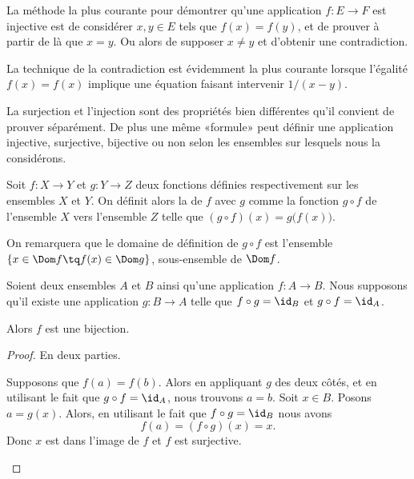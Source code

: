 \begin{normaltext}\label{NORMooMethodePreuveInj}
	La méthode la plus courante pour démontrer qu'une application \( f\colon E\to F\) est injective est de considérer \( x,y\in E\) tels que \( f(x)=f(y)\), et de prouver à partir de là que \( x=y\). Ou alors de supposer \( x\neq y\) et d'obtenir une contradiction.

	La technique de la contradiction est évidemment la plus courante lorsque l'égalité \( f(x)=f(x)\) implique une équation faisant intervenir \( 1/(x-y)\).

	La surjection et l'injection sont des propriétés bien différentes qu'il convient de prouver séparément. De plus une même «formule» peut définir une application injective, surjective, bijective ou non selon les ensembles sur lesquels nous la considérons.
\end{normaltext}

\begin{definition}  \label{DEFcomposeeFonctions}
	Soit \( f: X \to Y \) et \( g: Y \to Z \) deux fonctions définies respectivement sur les ensembles \( X \) et \( Y \). On définit alors la  de \( f \) avec \( g \) comme la fonction \( g \circ f \) de l'ensemble \( X \) vers l'ensemble \( Z \) telle que \( (g \circ f) (x) = g\bigl(f(x)\bigr) \).

	On remarquera que le domaine de définition de \( g \circ f \) est l'ensemble \( \{ x \in \Dom f \tq f(x) \in \Dom g\}\), sous-ensemble de \( \Dom f \).
\end{definition}

\begin{lemma}       \label{LEMooWBYSooFqyqQP}
	Soient deux ensembles \( A\) et \( B\) ainsi qu'une application \( f\colon A\to B\). Nous supposons qu'il existe une application \( g\colon B\to A\) telle que \( f\circ g=\id_B\) et \( g\circ f=\id_A\).

	Alors \( f\) est une bijection.
\end{lemma}

\begin{proof}
	En deux parties.
	\begin{subproof}
		\spitem[Injection]
		Supposons que \( f(a)=f(b)\). Alors en appliquant \( g\) des deux côtés, et en utilisant le fait que \( g\circ f=\id_A\), nous trouvons \( a=b\).
		\spitem[Surjection]
		Soit \( x\in B\). Posons \( a=g(x)\). Alors, en utilisant le fait que \( f\circ g=\id_B\) nous avons
		\begin{equation}
			f(a)=(f\circ g)(x)=x.
		\end{equation}
		Donc \( x\) est dans l'image de \( f\) et \( f\) est surjective.
	\end{subproof}
\end{proof}

